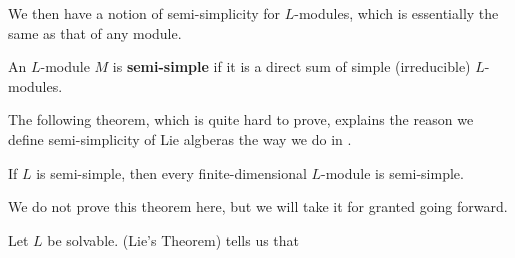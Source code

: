 We then have a notion of semi-simplicity for $L$-modules, which is essentially the same as that of any module.

\begin{boxdefinition}\label{Ch2:Def:SemiSimpleModule}
    An $L$-module $M$ is \textbf{semi-simple} if it is a direct sum of simple (irreducible) $L$-modules.
\end{boxdefinition}

The following theorem, which is quite hard to prove, explains the reason we define semi-simplicity of Lie algberas the way we do in .

\begin{boxtheorem}\label{Ch2:Thm:SemiSimpleLieToModule}
    If $L$ is semi-simple, then every finite-dimensional $L$-module is semi-simple.
\end{boxtheorem}

We do not prove this theorem here, but we will take it for granted going forward.

\begin{boxexample}
    Let $L$ be solvable.  (Lie's Theorem) tells us that \sorry %
\end{boxexample}


